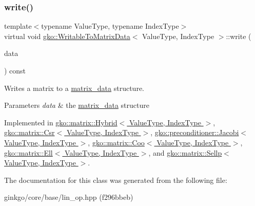 \subsubsection{\texorpdfstring{write()}{write()}}
{\footnotesize\ttfamily template$<$typename Value\+Type, typename Index\+Type$>$ \\
virtual void \hyperlink{classgko_1_1WritableToMatrixData}{gko\+::\+Writable\+To\+Matrix\+Data}$<$ Value\+Type, Index\+Type $>$\+::write (\begin{DoxyParamCaption}\item[{\hyperlink{structgko_1_1matrix__data}{matrix\+\_\+data}$<$ Value\+Type, Index\+Type $>$ \&}]{data }\end{DoxyParamCaption}) const\hspace{0.3cm}{\ttfamily [pure virtual]}}



Writes a matrix to a \hyperlink{structgko_1_1matrix__data}{matrix\+\_\+data} structure. 


\begin{DoxyParams}{Parameters}
{\em data} & the \hyperlink{structgko_1_1matrix__data}{matrix\+\_\+data} structure \\
\hline
\end{DoxyParams}


Implemented in \hyperlink{classgko_1_1matrix_1_1Hybrid_a626c07541641bcdfd9a7f61322a89cbe}{gko\+::matrix\+::\+Hybrid$<$ Value\+Type, Index\+Type $>$}, \hyperlink{classgko_1_1matrix_1_1Csr_a205fc391f4cf4f7718a55b0a61f62bc9}{gko\+::matrix\+::\+Csr$<$ Value\+Type, Index\+Type $>$}, \hyperlink{classgko_1_1preconditioner_1_1Jacobi_ac52bb1c70d4882876da1ee21c3b124ee}{gko\+::preconditioner\+::\+Jacobi$<$ Value\+Type, Index\+Type $>$}, \hyperlink{classgko_1_1matrix_1_1Coo_ae193466ca1a4a3c7d1383ddc5a2701ab}{gko\+::matrix\+::\+Coo$<$ Value\+Type, Index\+Type $>$}, \hyperlink{classgko_1_1matrix_1_1Ell_afa9148a16a9255003055d8e9156ee941}{gko\+::matrix\+::\+Ell$<$ Value\+Type, Index\+Type $>$}, and \hyperlink{classgko_1_1matrix_1_1Sellp_aae2355a2866318b154d017b1c51f30a5}{gko\+::matrix\+::\+Sellp$<$ Value\+Type, Index\+Type $>$}.



The documentation for this class was generated from the following file\+:\begin{DoxyCompactItemize}
\item 
ginkgo/core/base/lin\+\_\+op.\+hpp (f296bbeb)\end{DoxyCompactItemize}
